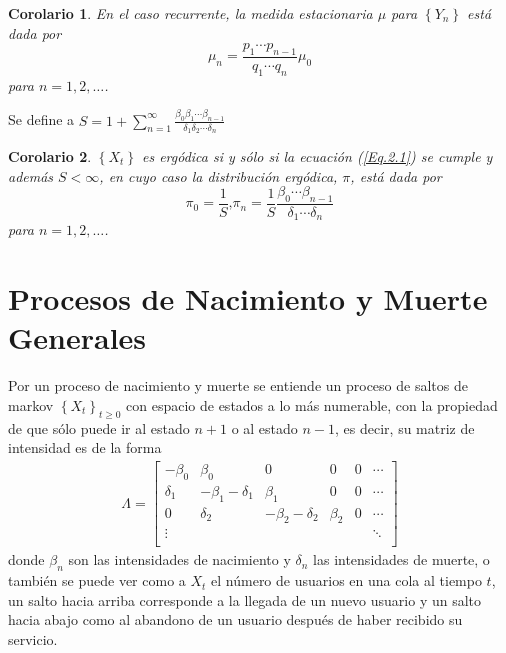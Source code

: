 \documentclass{article}
\newtheorem{Cor}{Corolario}
\begin{document}
\begin{Cor}\label{Cor.2.3}
En el caso recurrente, la medida estacionaria $\mu$ para
$\left\{Y_{n}\right\}$ est\'a dada por
\begin{equation}
\mu_{n}=\frac{p_{1}\cdots p_{n-1}}{q_{1}\cdots q_{n}}\mu_{0}
\end{equation}
para $n=1,2,\ldots$.
\end{Cor}

Se define a
$S=1+\sum_{n=1}^{\infty}\frac{\beta_{0}\beta_{1}\cdots\beta_{n-1}}{\delta_{1}\delta_{2}\cdots\delta_{n}}$

\begin{Cor}\label{Cor.2.4}
$\left\{X_{t}\right\}$ es erg\'odica si y s\'olo si la ecuaci\'on
(\ref{Eq.2.1}) se cumple y adem\'as $S<\infty$, en cuyo caso la
distribuci\'on erg\'odica, $\pi$, est\'a dada por
\begin{equation}\label{Eq.2.4}
\pi_{0}=\frac{1}{S}\textrm{,
}\pi_{n}=\frac{1}{S}\frac{\beta_{0}\cdots\beta_{n-1}}{\delta_{1}\cdots\delta_{n}}
\end{equation}
para $n=1,2,\ldots$.
\end{Cor}
\section{Procesos de Nacimiento y Muerte Generales}

Por un proceso de nacimiento y muerte se entiende un proceso de saltos de markov $\left\{X_{t}\right\}_{t\geq0}$ con espacio de estados a lo m\'as numerable, con la propiedad de que s\'olo puede ir al estado $n+1$ o al estado $n-1$, es decir, su matriz de intensidad es de la forma
\begin{eqnarray*}
\Lambda=\left[\begin{array}{cccccc}
-\beta_{0} & \beta_{0} & 0 &0 &0& \cdots\\
\delta_{1} & -\beta_{1}-\delta_{1} & \beta_{1} & 0 & 0 &\cdots\\
0 & \delta_{2} & -\beta_{2}-\delta_{2} & \beta_{2} & 0 &\cdots\\
\vdots & & & & & \ddots\\
\end{array}\right]
\end{eqnarray*}
donde $\beta_{n}$ son las intensidades de nacimiento y $\delta_{n}$ las intensidades de muerte, o tambi\'en se puede ver como a $X_{t}$ el n\'umero de usuarios en una cola al tiempo $t$, un salto hacia arriba corresponde a la llegada de un nuevo usuario y un salto hacia abajo como al abandono de un usuario despu\'es de haber recibido su servicio.
\end{document}
